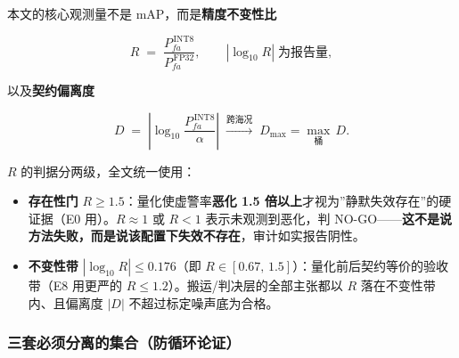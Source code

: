 本文的核心观测量不是 mAP，而是\textbf{精度不变性比}

\[
R \;=\; \frac{P_{fa}^{\,\mathrm{INT8}}}{P_{fa}^{\,\mathrm{FP32}}},
\qquad
|\log_{10} R| \;\text{为报告量},
\tag{3.6}
\]

以及\textbf{契约偏离度}

\[
D \;=\; \left|\log_{10}\frac{P_{fa}^{\,\mathrm{INT8}}}{\alpha}\right|
\;\xrightarrow{\text{跨海况}}\; D_{\max}=\max_{\text{桶}}\,D .
\tag{3.7}
\]

\(R\) 的判据分两级，全文统一使用：

\begin{itemize}
\tightlist
\item
  \textbf{存在性门} \(R\ge 1.5\)：量化使虚警率\textbf{恶化 1.5
  倍以上}才视为''静默失效存在''的硬证据（E0 用）。\(R\approx1\) 或
  \(R<1\) 表示未观测到恶化，判
  NO-GO------\textbf{这不是说方法失败，而是说该配置下失效不存在}，审计如实报告阴性。
\item
  \textbf{不变性带} \(|\log_{10}R|\le 0.176\)（即
  \(R\in[0.67,\,1.5]\)）：量化前后契约等价的验收带（E8 用更严的
  \(R\le1.2\)）。搬运/判决层的全部主张都以 \(R\)
  落在不变性带内、且偏离度 \(|D|\) 不超过标定噪声底为合格。
\end{itemize}

\subsubsection{三套必须分离的集合（防循环论证）}\label{ux4e09ux5957ux5fc5ux987bux5206ux79bbux7684ux96c6ux5408ux9632ux5faaux73afux8bbaux8bc1}


